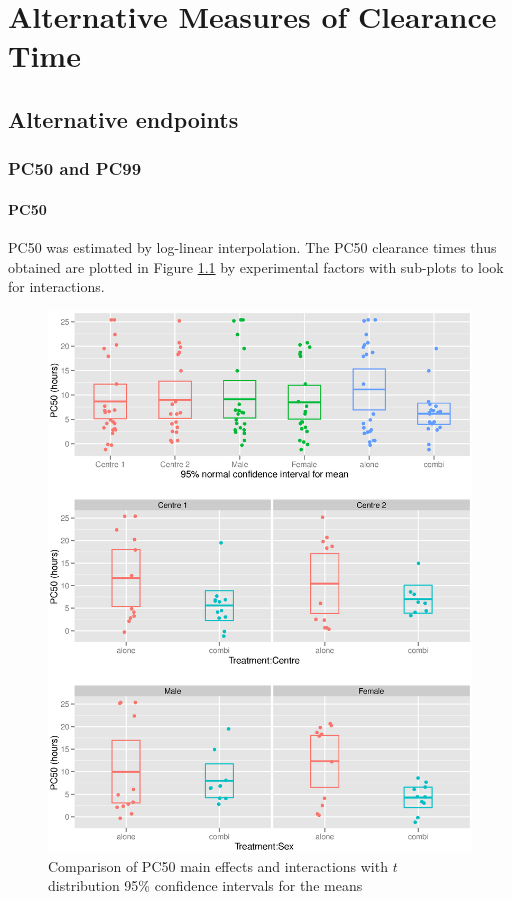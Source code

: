 \chapter{Alternative Measures of Clearance Time}\label{analysis}

\section{Alternative endpoints}
\subsection{PC50 and PC99}
\subsubsection*{PC50}
PC50 was estimated by log-linear interpolation. The PC50 clearance times thus obtained are plotted in Figure \ref{pc50anova} by experimental factors with sub-plots to look for interactions.
\begin{figure}[p]
\includegraphics[width=150mm]{pc50anova.eps} 
\caption{Comparison of PC50 main effects and interactions with $t$ distribution 95\% confidence intervals for the means}
\label{pc50anova}
\end{figure}
